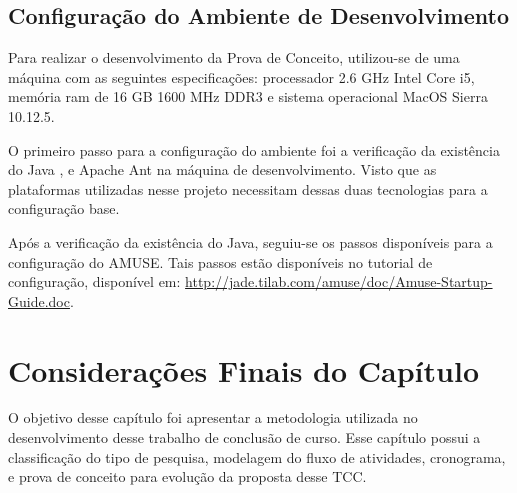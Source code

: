   \subsection{Configuração do Ambiente de Desenvolvimento}
  \label{subsec:configambiente}

  Para realizar o desenvolvimento da Prova de Conceito, utilizou-se de uma
  máquina com as seguintes especificações: processador 2.6 GHz Intel Core i5,
  memória ram de 16 GB 1600 MHz DDR3 e sistema operacional MacOS Sierra 10.12.5.

  O primeiro passo para a configuração do ambiente foi a verificação da
  existência do Java \cite{java}, e Apache Ant \cite{ant} na máquina de
  desenvolvimento. Visto que as plataformas utilizadas nesse projeto
  necessitam dessas duas tecnologias para a configuração base.

  Após a verificação da existência do Java, seguiu-se os passos disponíveis para
  a configuração do AMUSE. Tais passos estão disponíveis no tutorial de
  configuração, disponível em:
  \url{http://jade.tilab.com/amuse/doc/Amuse-Startup-Guide.doc}.



\section{Considerações Finais do Capítulo}

O objetivo desse capítulo foi apresentar a metodologia utilizada no
desenvolvimento desse trabalho de conclusão de curso. Esse capítulo possui a
classificação do tipo de pesquisa, modelagem do fluxo de atividades,
cronograma, e prova de conceito para evolução da proposta desse TCC.
